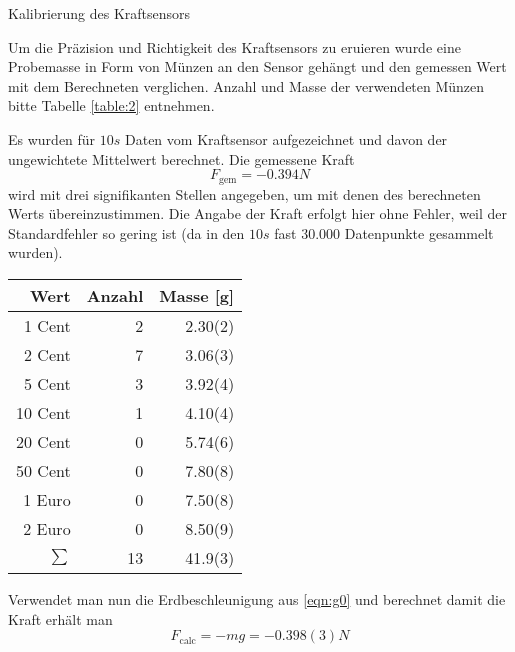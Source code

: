 \documentclass{alex_gp}
\begin{document}
\begin{mybox}{Kalibrierung des Kraftsensors}
	\begin{vwcol}[widths={0.6,0.4}, sep=.8cm, justify=flush,rule=0pt, indent=1em, lines=21] 
		Um die Präzision und Richtigkeit des Kraftsensors zu eruieren wurde eine Probemasse in Form von Münzen an den Sensor gehängt und den gemessen Wert mit dem Berechneten verglichen. Anzahl und Masse der verwendeten Münzen bitte Tabelle \ref{table:2} entnehmen.\par
		
		Es wurden für \( 10 \unit{s} \) Daten vom  Kraftsensor aufgezeichnet und davon der ungewichtete Mittelwert berechnet. Die gemessene Kraft 
		\begin{equation}\label{eqn:Fgem}
			F_{\text{gem}} = -0.394 \unit{N}
		\end{equation}
		wird mit drei signifikanten Stellen angegeben, um mit denen des berechneten Werts übereinzustimmen.
		Die Angabe der Kraft erfolgt hier ohne Fehler, weil der Standardfehler so gering ist (da in den \( 10 \unit{s} \) fast 30.000 Datenpunkte gesammelt wurden).
		\newpage
		\begin{minipage}[t][1cm][t]{0.35\textwidth}
			\begin{tabular}{@{} rrr @{}}\toprule
				Wert & Anzahl & Masse [g] \\ \midrule
				1 Cent & 2 & 2.30(2) \\
				2 Cent & 7 & 3.06(3) \\
				5 Cent & 3 & 3.92(4) \\
				10 Cent & 1 & 4.10(4) \\
				20 Cent & 0 & 5.74(6) \\
				50 Cent & 0 & 7.80(8) \\
				1 Euro & 0 & 7.50(8) \\
				2 Euro & 0 & 8.50(9) \\
				\midrule
				\( \sum \) & 13 & 41.9(3) \\
				\bottomrule
			\end{tabular}
			\label{table:2}
		\end{minipage}
	\end{vwcol}
	\vspace{-2cm}\noindent
	Verwendet man nun die Erdbeschleunigung aus \ref{eqn:g0} und berechnet damit die Kraft erhält man
	\begin{equation}\label{eqn:Ferr}
		F_{\text{calc}} = -mg = -0.398(3) \unit{N}
	\end{equation}

\end{mybox}
\end{document}
